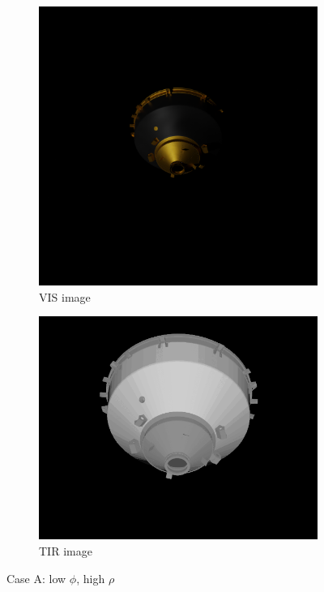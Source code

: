 \begin{figure}[!h]
\centering
\begin{subfigure}{0.2576\linewidth}
    \centering
    \includegraphics[width = \linewidth]{Images/Cas1Vis.png}
    \caption{VIS image}
    \label{fig:Cas1Vis}
\end{subfigure}\quad\quad\quad\quad\quad\quad\quad
\begin{subfigure}{0.32\linewidth}
    \centering
    \includegraphics[width = \linewidth]{Images/Cas1Tir.png}
    \caption{TIR image}
    \label{fig:Cas1Tir}
\end{subfigure}
\caption{Case A: low $\phi$, high $\rho$}
\label{fig:Cas1}
\end{figure}
